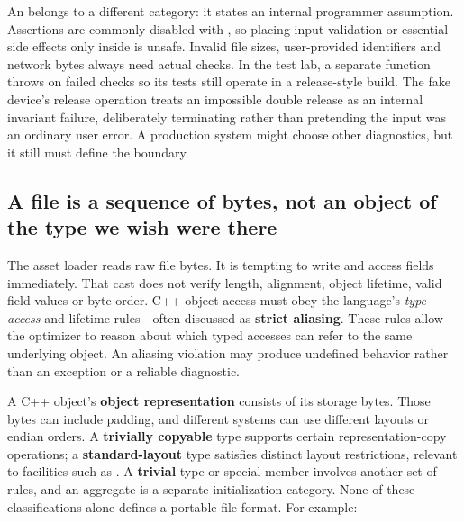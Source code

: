 An  belongs to a different category: it states an internal programmer assumption. Assertions are commonly disabled with , so placing input validation or essential side effects only inside  is unsafe. Invalid file sizes, user-provided identifiers and network bytes always need actual checks. In the test lab, a separate  function throws on failed checks so its tests still operate in a release-style  build. The fake device's release operation treats an impossible double release as an internal invariant failure, deliberately terminating rather than pretending the input was an ordinary user error. A production system might choose other diagnostics, but it still must define the boundary.

\subsection{A file is a sequence of bytes, not an object of the type we wish were there}\label{01-foundations-i-ch004-a-file-is-a-sequence-of-bytes-not-an-object-of-the-type-we-wish-were-there}

\hypertarget{01-foundations-i-ch004-a-file-is-a-sequence-of-bytes-not-an-object-of-the-type-we-wish-were-there}{}

The asset loader reads raw file bytes. It is tempting to write  and access fields immediately. That cast does not verify length, alignment, object lifetime, valid field values or byte order. C++ object access must obey the language's \emph{type-access} and lifetime rules---often discussed as \textbf{strict aliasing}. These rules allow the optimizer to reason about which typed accesses can refer to the same underlying object. An aliasing violation may produce undefined behavior rather than an exception or a reliable diagnostic.

A C++ object's \textbf{object representation} consists of its storage bytes. Those bytes can include padding, and different systems can use different layouts or endian orders. A \textbf{trivially copyable} type supports certain representation-copy operations; a \textbf{standard-layout} type satisfies distinct layout restrictions, relevant to facilities such as . A \textbf{trivial} type or special member involves another set of rules, and an aggregate is a separate initialization category. None of these classifications alone defines a portable file format. For example:


